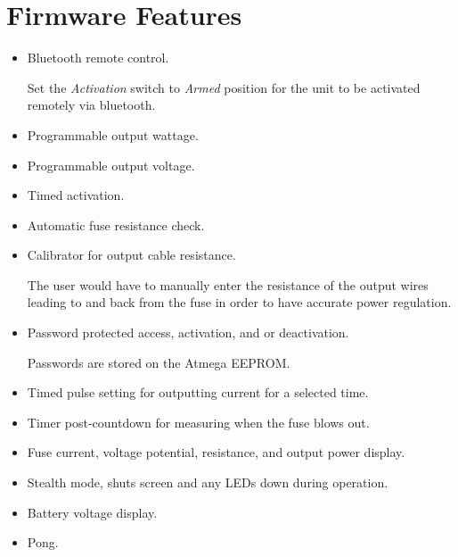 \documentclass{article}
\begin{document}
\section{Firmware Features}
\begin{itemize}
	\item Bluetooth remote control.
	
	Set the \textit{Activation} switch to \textit{Armed} position for the unit to be activated remotely via bluetooth.
	\item Programmable output wattage.
	\item Programmable output voltage.
	\item Timed activation.
	\item Automatic fuse resistance check.
	\item Calibrator for output cable resistance.
	
	The user would have to manually enter the resistance of the output wires leading to and back from the fuse in order to have accurate power regulation.
	\item Password protected access, activation, and or deactivation.
	
	Passwords are stored on the Atmega EEPROM.
	\item Timed pulse setting for outputting current for a selected time.
	\item Timer post-countdown for measuring when the fuse blows out.
	\item Fuse current, voltage potential, resistance, and output power display.
	\item Stealth mode, shuts screen and any LEDs down during operation.
	\item Battery voltage display.
	\item Pong.


\end{itemize}
\end{document}

